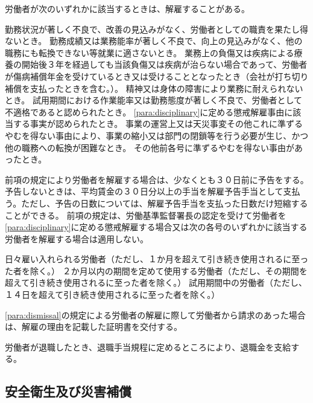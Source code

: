 \documentclass[10pt,a4paper,uplatex]{jsarticle}
\begin{document}
労働者が次のいずれかに該当するときは、解雇することがある。
\label{para:dismissal}
\begin{enumerate}
    \itm 勤務状況が著しく不良で、改善の見込みがなく、労働者としての職責を果たし得ないとき。
    \itm 勤務成績又は業務能率が著しく不良で、向上の見込みがなく、他の職務にも転換できない等就業に適さないとき。
    \itm 業務上の負傷又は疾病による療養の開始後３年を経過しても当該負傷又は疾病が治らない場合であって、労働者が傷病補償年金を受けているとき又は受けることとなったとき（会社が打ち切り補償を支払ったときを含む。）。
    \itm 精神又は身体の障害により業務に耐えられないとき。
    \itm 試用期間における作業能率又は勤務態度が著しく不良で、労働者として不適格であると認められたとき。
    \itm \ref{para:disciplinary}に定める懲戒解雇事由に該当する事実が認められたとき。
    \itm 事業の運営上又は天災事変その他これに準ずるやむを得ない事由により、事業の縮小又は部門の閉鎖等を行う必要が生じ、かつ他の職務への転換が困難なとき。
    \itm その他前各号に準ずるやむを得ない事由があったとき。
\end{enumerate}
\term
前項の規定により労働者を解雇する場合は、少なくとも３０日前に予告をする。予告しないときは、平均賃金の３０日分以上の手当を解雇予告手当として支払う。ただし、予告の日数については、解雇予告手当を支払った日数だけ短縮することができる。
\term
前項の規定は、労働基準監督署長の認定を受けて労働者を\ref{para:disciplinary}に定める懲戒解雇する場合又は次の各号のいずれかに該当する労働者を解雇する場合は適用しない。
\begin{enumerate}
    \itm 日々雇い入れられる労働者（ただし、１か月を超えて引き続き使用されるに至った者を除く。）
    \itm ２か月以内の期間を定めて使用する労働者（ただし、その期間を超えて引き続き使用されるに至った者を除く。）
    \itm 試用期間中の労働者（ただし、１４日を超えて引き続き使用されるに至った者を除く。）
\end{enumerate}
\term
\ref{para:dismissal}の規定による労働者の解雇に際して労働者から請求のあった場合は、解雇の理由を記載した証明書を交付する。

労働者が退職したとき、退職手当規程に定めるところにより、退職金を支給する。
\label{para:severance}

\subsection{安全衛生及び災害補償}
\end{document}
